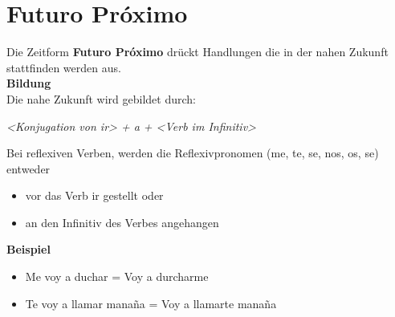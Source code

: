 \documentclass{../spanish_summary}
\begin{document}
\chapter*{Futuro Próximo}
Die Zeitform \textbf{Futuro Próximo} drückt Handlungen die in der nahen Zukunft stattfinden werden aus.\\[2ex]
\textbf{Bildung}\\
Die nahe Zukunft wird gebildet durch:\\

\begin{center}
\textit{<Konjugation von ir> + a + <Verb im Infinitiv>}\\[2ex]
\end{center}

Bei reflexiven Verben, werden die Reflexivpronomen (me, te, se, nos, os, se) entweder
\begin{itemize}
  \item vor das Verb ir gestellt oder
  \item an den Infinitiv des Verbes angehangen
\end{itemize}
\bigskip
\textbf{Beispiel}
\begin{itemize}
\item Me voy a duchar = Voy a durcharme
\item Te voy a llamar mana\~{n}a = Voy a llamarte mana\~{n}a
\end{itemize}

\newpage
\end{document}
